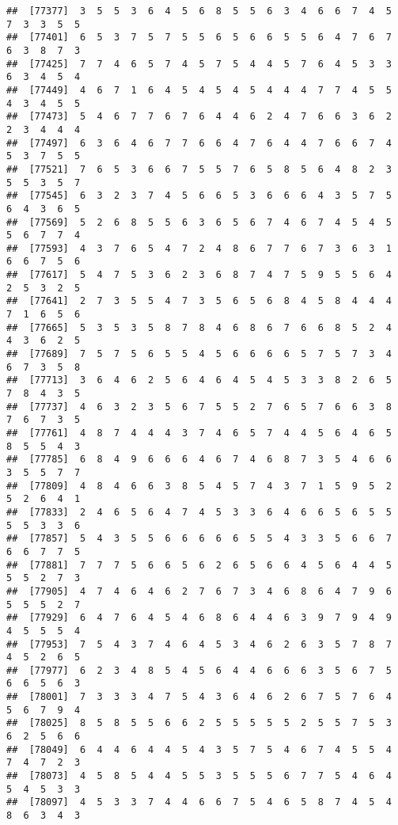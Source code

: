 \documentclass[
]{book}
\begin{document}
\begin{verbatim}
##  [77377]  3  5  5  3  6  4  5  6  8  5  5  6  3  4  6  6  7  4  5  7  3  3  5  5
##  [77401]  6  5  3  7  5  7  5  5  6  5  6  6  5  5  6  4  7  6  7  6  3  8  7  3
##  [77425]  7  7  4  6  5  7  4  5  7  5  4  4  5  7  6  4  5  3  3  6  3  4  5  4
##  [77449]  4  6  7  1  6  4  5  4  5  4  5  4  4  4  7  7  4  5  5  4  3  4  5  5
##  [77473]  5  4  6  7  7  6  7  6  4  4  6  2  4  7  6  6  3  6  2  2  3  4  4  4
##  [77497]  6  3  6  4  6  7  7  6  6  4  7  6  4  4  7  6  6  7  4  5  3  7  5  5
##  [77521]  7  6  5  3  6  6  7  5  5  7  6  5  8  5  6  4  8  2  3  5  5  3  5  7
##  [77545]  6  3  2  3  7  4  5  6  6  5  3  6  6  6  4  3  5  7  5  6  4  3  6  5
##  [77569]  5  2  6  8  5  5  6  3  6  5  6  7  4  6  7  4  5  4  5  5  6  7  7  4
##  [77593]  4  3  7  6  5  4  7  2  4  8  6  7  7  6  7  3  6  3  1  6  6  7  5  6
##  [77617]  5  4  7  5  3  6  2  3  6  8  7  4  7  5  9  5  5  6  4  2  5  3  2  5
##  [77641]  2  7  3  5  5  4  7  3  5  6  5  6  8  4  5  8  4  4  4  7  1  6  5  6
##  [77665]  5  3  5  3  5  8  7  8  4  6  8  6  7  6  6  8  5  2  4  4  3  6  2  5
##  [77689]  7  5  7  5  6  5  5  4  5  6  6  6  6  5  7  5  7  3  4  6  7  3  5  8
##  [77713]  3  6  4  6  2  5  6  4  6  4  5  4  5  3  3  8  2  6  5  7  8  4  3  5
##  [77737]  4  6  3  2  3  5  6  7  5  5  2  7  6  5  7  6  6  3  8  7  6  7  3  5
##  [77761]  4  8  7  4  4  4  3  7  4  6  5  7  4  4  5  6  4  6  5  8  5  5  4  3
##  [77785]  6  8  4  9  6  6  6  4  6  7  4  6  8  7  3  5  4  6  6  3  5  5  7  7
##  [77809]  4  8  4  6  6  3  8  5  4  5  7  4  3  7  1  5  9  5  2  5  2  6  4  1
##  [77833]  2  4  6  5  6  4  7  4  5  3  3  6  4  6  6  5  6  5  5  5  5  3  3  6
##  [77857]  5  4  3  5  5  6  6  6  6  6  5  5  4  3  3  5  6  6  7  6  6  7  7  5
##  [77881]  7  7  7  5  6  6  5  6  2  6  5  6  6  4  5  6  4  4  5  5  5  2  7  3
##  [77905]  4  7  4  6  4  6  2  7  6  7  3  4  6  8  6  4  7  9  6  5  5  5  2  7
##  [77929]  6  4  7  6  4  5  4  6  8  6  4  4  6  3  9  7  9  4  9  4  5  5  5  4
##  [77953]  7  5  4  3  7  4  6  4  5  3  4  6  2  6  3  5  7  8  7  4  5  2  6  5
##  [77977]  6  2  3  4  8  5  4  5  6  4  4  6  6  6  3  5  6  7  5  6  6  5  6  3
##  [78001]  7  3  3  3  4  7  5  4  3  6  4  6  2  6  7  5  7  6  4  5  6  7  9  4
##  [78025]  8  5  8  5  5  6  6  2  5  5  5  5  5  2  5  5  7  5  3  6  2  5  6  6
##  [78049]  6  4  4  6  4  4  5  4  3  5  7  5  4  6  7  4  5  5  4  7  4  7  2  3
##  [78073]  4  5  8  5  4  4  5  5  3  5  5  5  6  7  7  5  4  6  4  5  4  5  3  3
##  [78097]  4  5  3  3  7  4  4  6  6  7  5  4  6  5  8  7  4  5  4  8  6  3  4  3

\end{verbatim}
\end{document}
